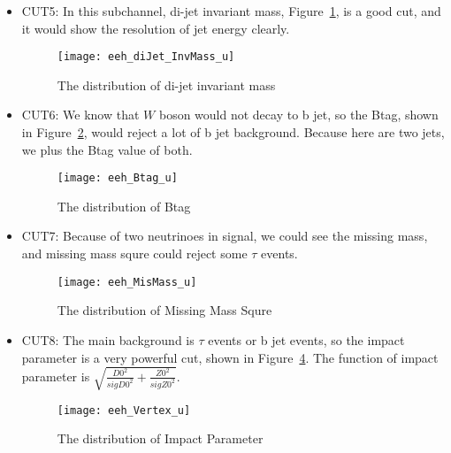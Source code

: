 \documentclass[11pt,a4paper]{cepcnote}
\begin{document}
\begin{itemize}
\item CUT5: In this subchannel, di-jet invariant mass, Figure~\ref{fig:semidijetinvmass}, is a good cut, 
and it would show the resolution of jet energy clearly.
\begin{figure}[H]
\centering
\texttt{[image: eeh\_diJet\_InvMass\_u]}
\caption[]{The distribution of di-jet invariant mass}
\label{fig:semidijetinvmass}
\end{figure}

\item CUT6: We know that $W$ boson would not decay to b jet, so the Btag, shown in Figure~\ref{fig:semiBtag},
would reject a lot of b jet background. Because here are two jets, we plus the Btag value of both.
\begin{figure}[H]
\centering
\texttt{[image: eeh\_Btag\_u]}
\caption[]{The distribution of Btag}
\label{fig:semiBtag}
\end{figure}

\item CUT7: Because of two neutrinoes in signal, we could see the missing mass, 
and missing mass squre could reject some $\tau$ events.
\begin{figure}[H]
\centering
\texttt{[image: eeh\_MisMass\_u]}
\caption[]{The distribution of Missing Mass Squre}
\label{fig:semiMM2}
\end{figure}

\item CUT8: The main background is $\tau$ events or b jet events, 
so the impact parameter is a very powerful cut, shown in Figure~\ref{fig:semid0z0}.
The function of impact parameter is 
$\sqrt{\frac{D0^2}{sigD0^2}+\frac{Z0^2}{sigZ0^2}}$.
\begin{figure}[H]
\centering
\texttt{[image: eeh\_Vertex\_u]}
\caption[]{The distribution of Impact Parameter}
\label{fig:semid0z0}
\end{figure}

\end{itemize}
\end{document}
